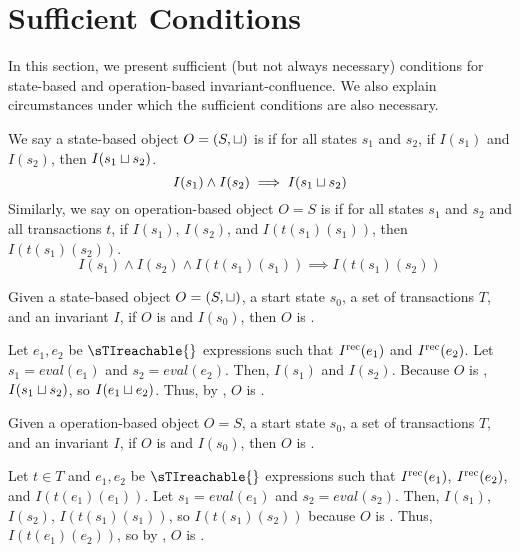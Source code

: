 \section{Sufficient Conditions}
In this section, we present sufficient (but not always necessary) conditions
for state-based and operation-based invariant-confluence. We also explain
circumstances under which the sufficient conditions are also necessary.

\begin{definition}
  We say a state-based object $O = (S, \sqcup)$ is  if for
  all states $s_1$ and $s_2$, if $I(s_1)$ and $I(s_2)$, then $I(s_1 \sqcup
  s_2)$.
  \[
    I(s_1) \land I(s_2) \implies I(s_1 \sqcup s_2)
  \]
  Similarly, we say on operation-based object $O = S$ is 
  if for all states $s_1$ and $s_2$ and all transactions $t$, if $I(s_1)$,
  $I(s_2)$, and $I(t(s_1)(s_1))$, then $I(t(s_1)(s_2))$.
  \[
    I(s_1) \land I(s_2) \land I(t(s_1)(s_1)) \implies I(t(s_1)(s_2))
  \]
\end{definition}

\begin{claim}
  Given a state-based object $O = (S, \sqcup)$, a start state $s_0$, a set of
  transactions $T$, and an invariant $I$, if $O$ is \Iclosed{} and $I(s_0)$,
  then $O$ is \sTIconfluent.
\end{claim}
\begin{elidableproof}
  Let $e_1, e_2$ be $\sTIreachable{}$ expressions such that $I^{\text{rec}}(e_1)$ and
  $I^{\text{rec}}(e_2)$. Let $s_1 = eval(e_1)$ and $s_2 = eval(e_2)$. Then, $I(s_1)$ and
  $I(s_2)$. Because $O$ is \Iclosed{}, $I(s_1 \sqcup s_2)$, so $I(e_1 \sqcup
  e_2)$. Thus, by , $O$ is
  \sTIconfluent{}.
\end{elidableproof}

\begin{claim}
  Given a operation-based object $O = S$, a start state $s_0$, a set of
  transactions $T$, and an invariant $I$, if $O$ is \Iclosed{} and $I(s_0)$,
  then $O$ is \sTIconfluent.
\end{claim}
\begin{elidableproof}
  Let $t \in T$ and $e_1, e_2$ be $\sTIreachable{}$ expressions such that
  $I^{\text{rec}}(e_1)$, $I^{\text{rec}}(e_2)$, and $I(t(e_1)(e_1))$. Let $s_1 = eval(e_1)$ and
  $s_2 = eval(s_2)$. Then, $I(s_1)$, $I(s_2)$, $I(t(s_1)(s_1))$, so
  $I(t(s_1)(s_2))$ because $O$ is \Iclosed. Thus, $I(t(e_1)(e_2))$, so by
  , $O$ is \sTIconfluent.
\end{elidableproof}

